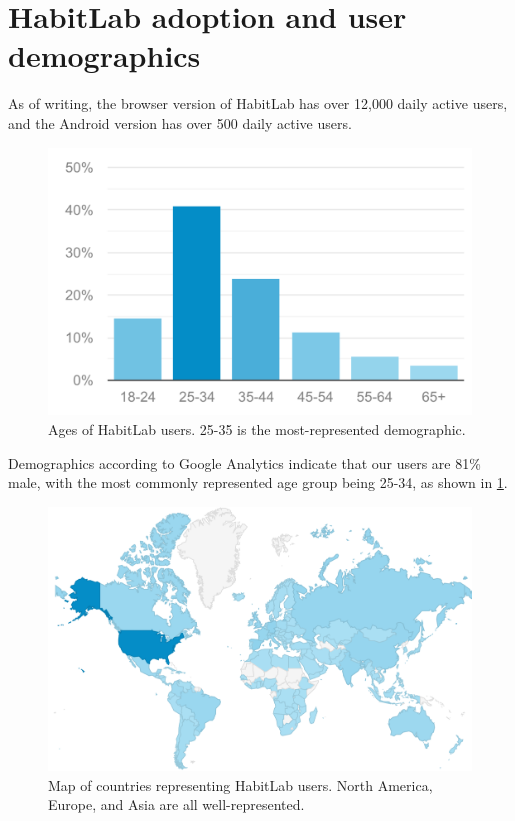 \section{HabitLab adoption and user demographics}

As of writing, the browser version of HabitLab has over 12,000 daily active users, and the Android version has over 500 daily active users.

\begin{figure}
\centering
	\includegraphics[height=0.3\textheight]{figuresS/user_ages.png}
	\caption{Ages of HabitLab users. 25-35 is the most-represented demographic.}
\label{fig:user_ages}
\end{figure}

Demographics according to Google Analytics indicate that our users are 81\% male, with the most commonly represented age group being 25-34, as shown in \ref{fig:user_ages}.

\begin{figure}
\centering
	\includegraphics[height=0.4\textheight]{figuresS/user_map.png}
	\caption{Map of countries representing HabitLab users. North America, Europe, and Asia are all well-represented.}
\label{fig:user_map}
\end{figure}

